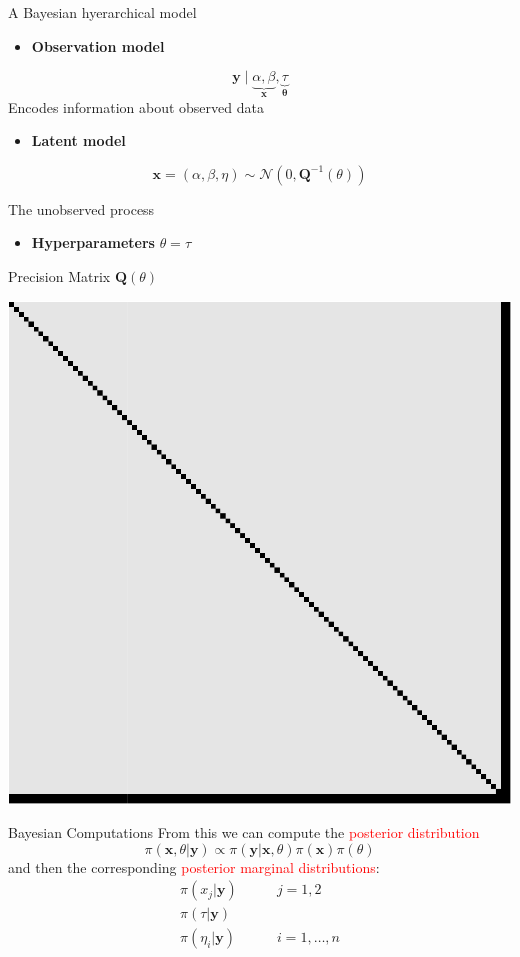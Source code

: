 \documentclass[
  ignorenonframetext,
]{beamer}
\providecommand{\tightlist}{%
  \setlength{\itemsep}{0pt}\setlength{\parskip}{0pt}}
\begin{document}
\begin{frame}{A Bayesian hyerarchical model}
\protect\hypertarget{a-bayesian-hyerarchical-model}{}
\begin{itemize}
\tightlist
\item
  \textbf{Observation model}
\end{itemize}

\[
\mathbf{y} \mid \underbrace{\alpha,
            \beta}_{\mathbf{x}}, \underbrace{\tau}_{\mathbf{\theta}}
\] Encodes information about observed data

\begin{itemize}
\tightlist
\item
  \textbf{Latent model}
\end{itemize}

\[
\mathbf{x} = (\alpha, \beta, \eta)\sim\mathcal{N}(0, \mathbf{Q}^{-1}(\theta))
\]

The unobserved process

\begin{itemize}
\tightlist
\item
  \textbf{Hyperparameters } \(\theta = \tau\)
\end{itemize}
\end{frame}

\begin{frame}{Precision Matrix \(\mathbf{Q}(\theta)\)}
\protect\hypertarget{precision-matrix-mathbfqtheta}{}
\begin{center}\includegraphics[width=0.6\linewidth]{Part1_intro_files/figure-beamer/unnamed-chunk-5-1} \end{center}
\end{frame}

\begin{frame}{Bayesian Computations}
\protect\hypertarget{bayesian-computations}{}
From this we can compute the \textcolor{red}{posterior distribution} \[
\pi(\mathbf{x}, \theta | \mathbf{y}) \propto \pi(\mathbf{y} | \mathbf{x},
     \theta) \pi(\mathbf{x}) \pi(\theta)
\] and then the corresponding
\textcolor{red}{posterior marginal distributions}: \[
\begin{aligned}
  \pi(x_j|\mathbf{y}) &\qquad  j = 1,2\\
  \pi(\tau|\mathbf{y})& \\
  \pi(\eta_i|\mathbf{y}) &\qquad  i = 1,\dots,n
\end{aligned}
\]
\end{frame}
\end{document}
